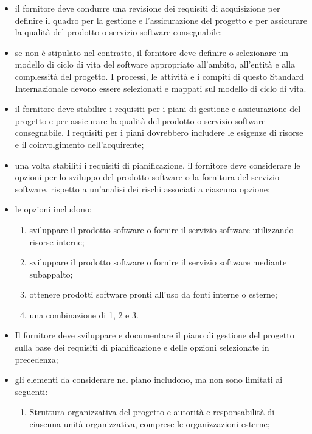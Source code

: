         \begin{itemize}
            \item il fornitore deve condurre una revisione dei requisiti di acquisizione per definire il quadro per la gestione e l'assicurazione del progetto e per assicurare la qualità del prodotto o servizio software consegnabile;
            \item se non è stipulato nel contratto, il fornitore deve definire o selezionare un modello di ciclo di vita del software appropriato all'ambito, all'entità e alla complessità del progetto. I processi, le attività e i compiti di questo Standard Internazionale devono essere selezionati e mappati sul modello di ciclo di vita.
            \item il fornitore deve stabilire i requisiti per i piani di gestione e assicurazione del progetto e per assicurare la qualità del prodotto o servizio software consegnabile. I requisiti per i piani dovrebbero includere le esigenze di risorse e il coinvolgimento dell’acquirente;
            \item una volta stabiliti i requisiti di pianificazione, il fornitore deve considerare le opzioni per lo sviluppo del prodotto software o la fornitura del servizio software, rispetto a un’analisi dei rischi associati a ciascuna opzione;
            \item le opzioni includono: 
            \begin{enumerate}
                \item sviluppare il prodotto software o fornire il servizio software utilizzando risorse interne;
                \item sviluppare il prodotto software o fornire il servizio software mediante subappalto;
                \item ottenere prodotti software pronti all’uso da fonti interne o esterne;
                \item una combinazione di 1, 2 e 3.
            \end{enumerate}
            \item Il fornitore deve sviluppare e documentare il piano di gestione del progetto sulla base dei requisiti di pianificazione e delle opzioni selezionate in precedenza;
            \item gli elementi da considerare nel piano includono, ma non sono limitati ai seguenti:
            \begin{enumerate}
                \item Struttura organizzativa del progetto e autorità e responsabilità di ciascuna unità organizzativa, comprese le organizzazioni esterne;

\end{enumerate}
\end{itemize}
